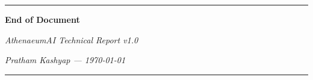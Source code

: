 \documentclass[12pt,a4paper]{article}
\begin{document}
\newpage
\thispagestyle{empty}
\vspace*{8cm}
\begin{center}
    \rule{0.4\textwidth}{1pt}\par
    \vspace{0.5cm}
    {\Large \bfseries \textcolor{primary}{End of Document}\par}
    \vspace{0.5cm}
    {\itshape AthenaeumAI Technical Report v1.0\par}
    \vspace{0.3cm}
    {\itshape Pratham Kashyap --- \today\par}
    \vspace{1cm}
    \rule{0.4\textwidth}{1pt}\par
\end{center}
\end{document}
